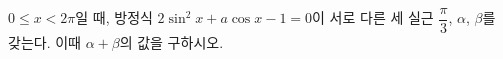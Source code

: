 $0\le x<2\pi$일 때, 방정식 $2\sin^2 x+a\cos x-1=0$이 서로 다른 세 실근 $\dfrac{\pi}{3}$, $\alpha$, $\beta$를 갖는다. 이때 $\alpha+\beta$의 값을 구하시오. 
